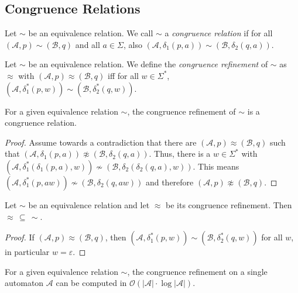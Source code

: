 \vspace{5pt}

\subsection{Congruence Relations}
\begin{defn}
	Let $\sim$ be an equivalence relation. We call $\sim$ a \emph{congruence relation} if for all $(\mathcal{A}, p) \sim (\mathcal{B}, q)$ and all $a \in \Sigma$, also $(\mathcal{A}, \delta_1(p, a)) \sim (\mathcal{B}, \delta_2(q, a))$.
\end{defn}

\begin{defn}
	Let $\sim$ be an equivalence relation. We define the \emph{congruence refinement} of $\sim$ as $\approx$ with $(\mathcal{A}, p) \approx (\mathcal{B}, q)$ iff for all $w \in \Sigma^*$, $(\mathcal{A}, \delta_1^*(p, w)) \sim (\mathcal{B}, \delta^*_2(q, w))$.
\end{defn}

\begin{lem}
	For a given equivalence relation $\sim$, the congruence refinement of $\sim$ is a congruence relation.
\end{lem}

\begin{proof}
	Assume towards a contradiction that there are $(\mathcal{A}, p) \approx (\mathcal{B}, q)$ such that $(\mathcal{A}, \delta_1(p, a)) \not\approx (\mathcal{B}, \delta_2(q, a))$. Thus, there is a $w \in \Sigma^*$ with $(\mathcal{A}, \delta_1^*(\delta_1(p, a), w)) \not\sim (\mathcal{B}, \delta_2(\delta_2(q, a), w))$. This means $(\mathcal{A}, \delta_1^*(p, aw)) \not\sim (\mathcal{B}, \delta_2(q, aw))$ and therefore $(\mathcal{A}, p) \not\approx (\mathcal{B}, q)$.
\end{proof}

\begin{lem}
	Let $\sim$ be an equivalence relation and let $\approx$ be its congruence refinement. Then $\approx \,\subseteq\, \sim$.
\end{lem}

\begin{proof}
	If $(\mathcal{A}, p) \approx (\mathcal{B}, q)$, then $(\mathcal{A}, \delta_1^*(p, w)) \sim (\mathcal{B}, \delta^*_2(q, w))$ for all $w$, in particular $w = \varepsilon$.
\end{proof}

\begin{lem}
	For a given equivalence relation $\sim$, the congruence refinement on a single automaton $\mathcal{A}$ can be computed in $\mathcal{O}(|\mathcal{A}| \cdot \log |\mathcal{A}|)$.
	\label{lem:general:congref_in_nlogn}
\end{lem}

